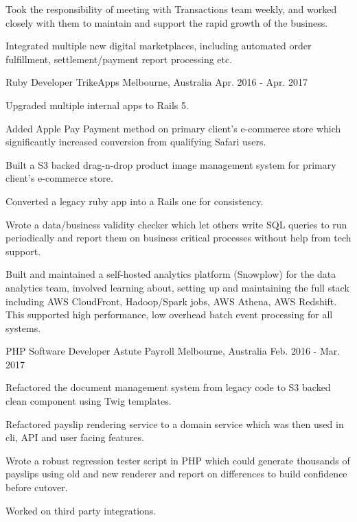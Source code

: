 \begin{cventries}
{\begin{cvitems}
        \item {Took the responsibility of meeting with Transactions team weekly, and worked closely with them to maintain and support the rapid growth of the business.}
        \item {Integrated multiple new digital marketplaces, including automated order fulfillment, settlement/payment report processing etc.}
      \end{cvitems}
    }
  \cventry
    {Ruby Developer} %
    {TrikeApps} %
    {Melbourne, Australia} %
    {Apr. 2016 - Apr. 2017} %
    {
      \begin{cvitems} %
        \item {Upgraded multiple internal apps to Rails 5.}
        \item {Added Apple Pay Payment method on primary client's e-commerce store which significantly increased conversion from qualifying Safari users.}
        \item {Built a S3 backed drag-n-drop product image management system for primary client's e-commerce store.}
        \item {Converted a legacy ruby app into a Rails one for consistency.}
        \item {Wrote a data/business validity checker which let others write SQL queries to run periodically and report them on business critical processes without help from tech support.}
        \item {Built and maintained a self-hosted analytics platform (Snowplow) for the data analytics team, involved learning about, setting up and maintaining the full stack including AWS CloudFront, Hadoop/Spark jobs, AWS Athena, AWS Redshift. This supported high performance, low overhead batch event processing for all systems.}
      \end{cvitems}
    }
  \cventry
    {PHP Software Developer} %
    {Astute Payroll} %
    {Melbourne, Australia} %
    {Feb. 2016 - Mar. 2017} %
    {
      \begin{cvitems} %
        \item {Refactored the document management system from legacy code to S3 backed clean component using Twig templates.}
        \item {Refactored payslip rendering service to a domain service which was then used in cli, API and user facing features.}
        \item {Wrote a robust regression tester script in PHP which could generate thousands of payslips using old and new renderer and report on differences to build confidence before cutover.}
        \item {Worked on third party integrations.}
      \end{cvitems}
    }


\end{cventries}
